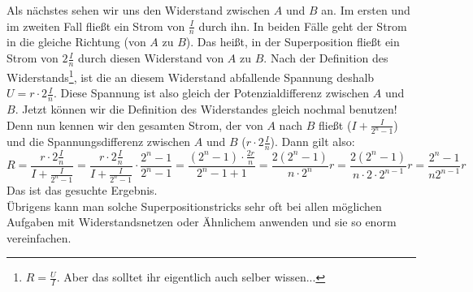 \begin{Answer}[ref = hypercube]
	Als nächstes sehen wir uns den Widerstand zwischen $A$ und $B$ an. Im ersten und im zweiten Fall fließt ein Strom von $\frac{I}{n}$ durch ihn. In beiden Fälle geht der Strom in die gleiche Richtung (von $A$ zu $B$). Das heißt, in der Superposition fließt ein Strom von $2\frac{I}{n}$ durch diesen Widerstand von $A$ zu $B$. Nach der Definition des Widerstands\footnote{$R=\frac{U}{I}$. Aber das solltet ihr eigentlich auch selber wissen...}, ist die an diesem Widerstand abfallende Spannung deshalb $U=r\cdot 2\frac{I}{n}$. Diese Spannung ist also gleich der Potenzialdifferenz zwischen $A$ und $B$. Jetzt können wir die Definition des Widerstandes gleich nochmal benutzen! Denn nun kennen wir den gesamten Strom, der von $A$ nach $B$ fließt ($I+\frac{I}{2^n-1}$) und die Spannungsdifferenz zwischen $A$ und $B$ ($r\cdot 2\frac{I}{n}$). Dann gilt also:
	\begin{equation*}
	R = \frac{r\cdot 2\frac{I}{n}}{I+\frac{I}{2^n-1}} = \frac{r\cdot 2\frac{I}{n}}{I+\frac{I}{2^n-1}} \cdot \frac{2^n-1}{2^n-1} = \frac{(2^n-1)\cdot \frac{2r}{n}}{2^n-1+1} = \frac{2(2^n-1)}{n \cdot 2^n}r = \frac{2(2^n-1)}{n \cdot 2 \cdot 2^{n-1}}r = \frac{2^n-1}{n2^{n-1}}r
	\end{equation*}
	Das ist das gesuchte Ergebnis.\\
	Übrigens kann man solche Superpositionstricks sehr oft bei allen möglichen Aufgaben mit Widerstandsnetzen oder Ähnlichem anwenden und sie so enorm vereinfachen.  
\end{Answer}
